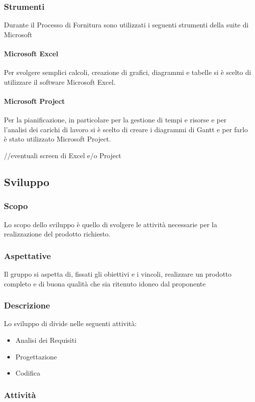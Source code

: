 \subsubsection{Strumenti}
Durante il Processo di Fornitura sono utilizzati i seguenti strumenti della suite di Microsoft
\paragraph{Microsoft Excel}
Per svolgere semplici calcoli, creazione di grafici, diagrammi e tabelle si è scelto di utilizzare il software Microsoft Excel.
\paragraph{Microsoft Project}
Per la pianificazione, in particolare per la gestione di tempi e risorse e per l'analisi dei carichi di lavoro si è scelto di creare i diagrammi di Gantt e per farlo è stato utilizzato Microsoft Project.

//eventuali screen di Excel e/o Project

\subsection{Sviluppo}
\subsubsection{Scopo}
Lo scopo dello sviluppo è quello di svolgere le attività necessarie per la realizzazione del prodotto richiesto.
\subsubsection{Aspettative}
Il gruppo si aspetta di, fissati gli obiettivi e i vincoli, realizzare un prodotto completo e di buona qualità che sia ritenuto idoneo dal proponente
\subsubsection{Descrizione}
Lo sviluppo di divide nelle seguenti attività:
\begin{itemize}
	\item Analisi dei Requisiti
	\item Progettazione
	\item Codifica
\end{itemize}
\subsubsection{Attività}
